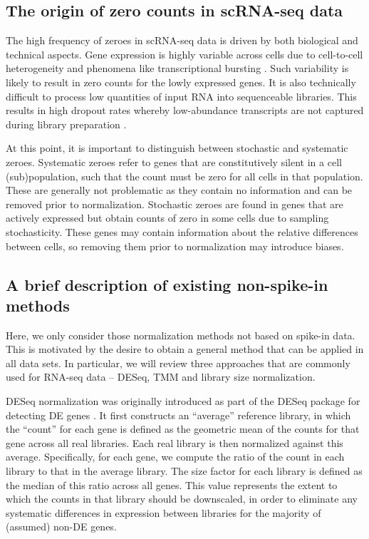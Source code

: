 \documentclass{article}
\begin{document}
\subsection{The origin of zero counts in scRNA-seq data}
The high frequency of zeroes in scRNA-seq data is driven by both biological and technical aspects.
Gene expression is highly variable across cells due to cell-to-cell heterogeneity and phenomena like transcriptional bursting \cite{marinov2014singlecell}.
Such variability is likely to result in zero counts for the lowly expressed genes.
It is also technically difficult to process low quantities of input RNA into sequenceable libraries.
This results in high dropout rates whereby low-abundance transcripts are not captured during library preparation \cite{brennecke2013accounting}.

At this point, it is important to distinguish between stochastic and systematic zeroes.
Systematic zeroes refer to genes that are constitutively silent in a cell (sub)population, such that the count must be zero for all cells in that population.
These are generally not problematic as they contain no information and can be removed prior to normalization.
Stochastic zeroes are found in genes that are actively expressed but obtain counts of zero in some cells due to sampling stochasticity.
These genes may contain information about the relative differences between cells, so removing them prior to normalization may introduce biases.

\subsection{A brief description of existing non-spike-in methods}
Here, we only consider those normalization methods not based on spike-in data.
This is motivated by the desire to obtain a general method that can be applied in all data sets.
In particular, we will review three approaches that are commonly used for RNA-seq data -- DESeq, TMM and library size normalization.

DESeq normalization was originally introduced as part of the DESeq package for detecting DE genes \cite{anders2010differential}.
It first constructs an ``average'' reference library, in which the ``count'' for each gene is defined as the geometric mean of the counts for that gene across all real libraries.
Each real library is then normalized against this average.
Specifically, for each gene, we compute the ratio of the count in each library to that in the average library.
The size factor for each library is defined as the median of this ratio across all genes.
This value represents the extent to which the counts in that library should be downscaled, 
    in order to eliminate any systematic differences in expression between libraries for the majority of (assumed) non-DE genes.
\end{document}
